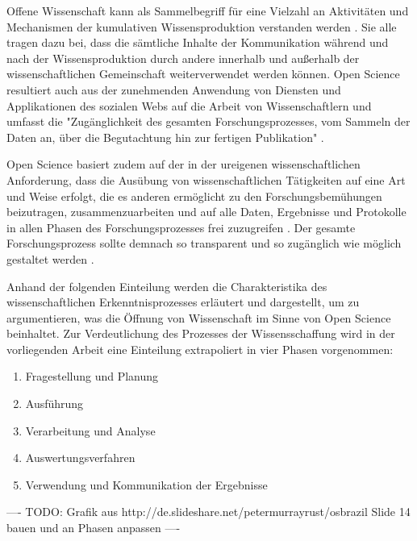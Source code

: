 Offene Wissenschaft kann als Sammelbegriff für eine Vielzahl an Aktivitäten und Mechanismen der kumulativen Wissensproduktion verstanden werden \cite{Mukherjee_2009}. Sie alle tragen dazu bei, dass die sämtliche Inhalte der Kommunikation während und nach der Wissensproduktion durch andere innerhalb und außerhalb der wissenschaftlichen Gemeinschaft weiterverwendet werden können. Open Science resultiert auch aus der zunehmenden Anwendung von Diensten und Applikationen des sozialen Webs auf die Arbeit von Wissenschaftlern und umfasst die "Zugänglichkeit des gesamten Forschungsprozesses, vom Sammeln der Daten an, über die Begutachtung hin zur fertigen Publikation" \cite{brembs2015open}.

Open Science basiert zudem auf der in der ureigenen wissenschaftlichen Anforderung, dass die Ausübung von wissenschaftlichen Tätigkeiten auf eine Art und Weise erfolgt, die es anderen ermöglicht zu den Forschungsbemühungen beizutragen, zusammenzuarbeiten und auf alle Daten, Ergebnisse und Protokolle in allen Phasen des Forschungsprozesses frei zuzugreifen \cite{RIN_2010_open_research}. Der gesamte Forschungsprozess sollte demnach so transparent und so zugänglich wie möglich gestaltet werden \cite{Scheliga_2014}.

Anhand der folgenden Einteilung werden die Charakteristika des wissenschaftlichen Erkenntnisprozesses erläutert und dargestellt, um zu argumentieren, was die Öffnung von Wissenschaft im Sinne von Open Science beinhaltet. Zur Verdeutlichung des Prozesses der Wissensschaffung wird in der vorliegenden Arbeit eine Einteilung extrapoliert in vier Phasen vorgenommen:
\begin{enumerate}
\item Fragestellung und Planung
\item Ausführung
\item Verarbeitung und Analyse
\item Auswertungsverfahren
\item Verwendung und Kommunikation der Ergebnisse
\end{enumerate}

---- TODO: Grafik aus http://de.slideshare.net/petermurrayrust/osbrazil Slide 14 bauen und an Phasen anpassen ----

